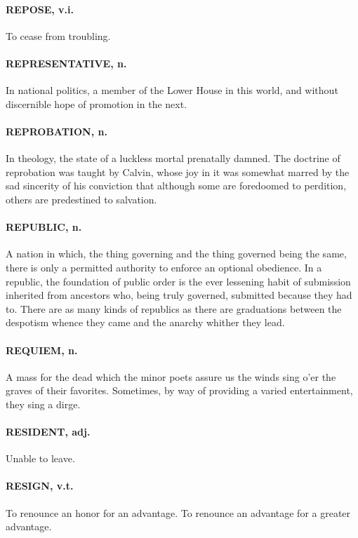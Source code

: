 \documentclass[11pt]{article}
\begin{document}
\paragraph{REPOSE, v.i.}  To cease from troubling.

\paragraph{REPRESENTATIVE, n.}  In national politics, a member of the Lower House
in this world, and without discernible hope of promotion in the next.

\paragraph{REPROBATION, n.}  In theology, the state of a luckless mortal
prenatally damned.  The doctrine of reprobation was taught by Calvin,
whose joy in it was somewhat marred by the sad sincerity of his
conviction that although some are foredoomed to perdition, others are
predestined to salvation.

\paragraph{REPUBLIC, n.}  A nation in which, the thing governing and the thing
governed being the same, there is only a permitted authority to
enforce an optional obedience.  In a republic, the foundation of
public order is the ever lessening habit of submission inherited from
ancestors who, being truly governed, submitted because they had to.
There are as many kinds of republics as there are graduations between
the despotism whence they came and the anarchy whither they lead.

\paragraph{REQUIEM, n.}  A mass for the dead which the minor poets assure us the
winds sing o'er the graves of their favorites.  Sometimes, by way of
providing a varied entertainment, they sing a dirge.

\paragraph{RESIDENT, adj.}  Unable to leave.

\paragraph{RESIGN, v.t.}  To renounce an honor for an advantage.  To renounce an
advantage for a greater advantage.
\end{document}
